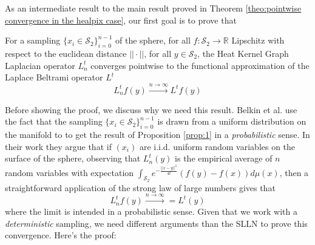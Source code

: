As an intermediate result to the main result proved in Theorem \ref{theo:pointwise convergence in the healpix case}, our first goal is to prove that 
\vspace{0.5cm}
\begin{prop}\label{prop:1}
	For a sampling $\{x_i\in\mathcal S_2\}_{i=0}^{n-1}$ of the sphere, for all $f: \mathcal S_2 \rightarrow \mathbb R$ Lipschitz with respect to the euclidean distance $||\cdot||$, for all $y\in\mathcal S_2$, the Heat Kernel Graph Laplacian operator $L^t_n$ converges pointwise to the functional approximation of the Laplace Beltrami operator $L^t$
	$$ L_n^tf(y)\xrightarrow{n\to\infty} L^tf(y)$$
\end{prop} 
\vspace{0.5cm}
Before showing the proof, we discuss why we need this result. Belkin et al. use the fact that the sampling $\{x_i\in\mathcal S_2\}_{i=0}^{n-1}$ is drawn from a uniform distribution on the manifold to to get the result of Proposition \ref{prop:1} in a \textit{probabilistic} sense. In their work they argue that if $(x_i)$ are i.i.d. uniform random variables on the surface of the sphere, observing that $L_n^t(y)$ is the empirical average of $n$ random variables with expectation $\int_{\mathcal S_2} e^{-\frac{||x-y||^2}{4t}}\left(f(y)-f(x)\right)d\mu(x)$, then a straightforward application of the strong law of large numbers gives that $$ L_n^tf(y)\xrightarrow{n\to\infty}  = L^t(y)$$ where the limit is intended in a probabilistic sense. Given that we work with a \textit{deterministic} sampling, we need different arguments than the SLLN to prove this convergence. Here's the proof:

